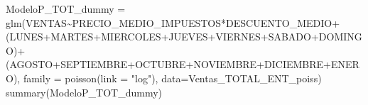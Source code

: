 \documentclass[
]{article}
\newenvironment{Shaded}{\begin{snugshade}}{\end{snugshade}}
\newcommand{\AttributeTok}[1]{\textcolor[rgb]{0.77,0.63,0.00}{#1}}
\newcommand{\FunctionTok}[1]{\textcolor[rgb]{0.00,0.00,0.00}{#1}}
\newcommand{\NormalTok}[1]{#1}
\newcommand{\OtherTok}[1]{\textcolor[rgb]{0.56,0.35,0.01}{#1}}
\newcommand{\SpecialCharTok}[1]{\textcolor[rgb]{0.00,0.00,0.00}{#1}}
\newcommand{\StringTok}[1]{\textcolor[rgb]{0.31,0.60,0.02}{#1}}
\begin{document}
\begin{Shaded}
\begin{Highlighting}[]
\NormalTok{ModeloP\_TOT\_dummy }\OtherTok{=} 
  \FunctionTok{glm}\NormalTok{(VENTAS}\SpecialCharTok{\textasciitilde{}}\NormalTok{PRECIO\_MEDIO\_IMPUESTOS}\SpecialCharTok{*}\NormalTok{DESCUENTO\_MEDIO}\SpecialCharTok{+}
\NormalTok{              (LUNES}\SpecialCharTok{+}\NormalTok{MARTES}\SpecialCharTok{+}\NormalTok{MIERCOLES}\SpecialCharTok{+}\NormalTok{JUEVES}\SpecialCharTok{+}\NormalTok{VIERNES}\SpecialCharTok{+}\NormalTok{SABADO}\SpecialCharTok{+}\NormalTok{DOMINGO)}\SpecialCharTok{+}
\NormalTok{              (AGOSTO}\SpecialCharTok{+}\NormalTok{SEPTIEMBRE}\SpecialCharTok{+}\NormalTok{OCTUBRE}\SpecialCharTok{+}\NormalTok{NOVIEMBRE}\SpecialCharTok{+}\NormalTok{DICIEMBRE}\SpecialCharTok{+}\NormalTok{ENERO),}
      \AttributeTok{family =} \FunctionTok{poisson}\NormalTok{(}\AttributeTok{link =} \StringTok{"log"}\NormalTok{),}
      \AttributeTok{data=}\NormalTok{Ventas\_TOTAL\_ENT\_poiss)}
\FunctionTok{summary}\NormalTok{(ModeloP\_TOT\_dummy)}
\end{Highlighting}
\end{Shaded}
\end{document}
